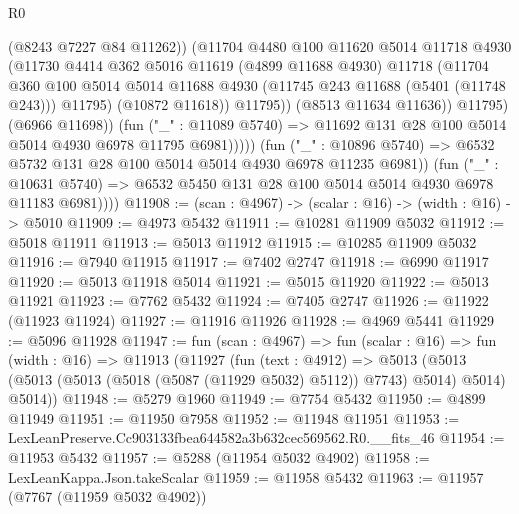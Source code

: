 \begin{lexlean}{R0}
\begin{coremodule}
                              (@8243 @7227 @84 @11262))
                            (@11704
                              @4480
                              @100
                              @11620
                              @5014
                              @11718
                              @4930
                              (@11730
                                @4414
                                @362
                                @5016
                                @11619
                                (@4899 @11688 @4930)
                                @11718
                                (@11704
                                  @360
                                  @100
                                  @5014
                                  @5014
                                  @11688
                                  @4930
                                  (@11745 @243 @11688 (@5401 (@11748 @243)))
                                  @11795)
                                (@10872 @11618))
                              @11795))
                          (@8513 @11634 @11636))
                        @11795)
                      (@6966 @11698))
                    (fun ("_" : @11089 @5740) =>
                    @11692 @131 @28 @100 @5014 @5014 @4930 @6978 @11795 @6981)))))
            (fun ("_" : @10896 @5740) =>
            @6532 @5732 @131 @28 @100 @5014 @5014 @4930 @6978 @11235 @6981))
          (fun ("_" : @10631 @5740) =>
          @6532 @5450 @131 @28 @100 @5014 @5014 @4930 @6978 @11183 @6981))))
@11908 := (scan : @4967) -> (scalar : @16) -> (width : @16) -> @5010
@11909 := @4973 @5432
@11911 := @10281 @11909 @5032
@11912 := @5018 @11911
@11913 := @5013 @11912
@11915 := @10285 @11909 @5032
@11916 := @7940 @11915
@11917 := @7402 @2747
@11918 := @6990 @11917
@11920 := @5013 @11918 @5014
@11921 := @5015 @11920
@11922 := @5013 @11921
@11923 := @7762 @5432
@11924 := @7405 @2747
@11926 := @11922 (@11923 @11924)
@11927 := @11916 @11926
@11928 := @4969 @5441
@11929 := @5096 @11928
@11947 := fun (scan : @4967) =>
  fun (scalar : @16) =>
  fun (width : @16) =>
  @11913
    (@11927
      (fun (text : @4912) =>
      @5013 (@5013 (@5013 (@5013 (@5018 (@5087 (@11929 @5032) @5112)) @7743) @5014) @5014) @5014))
@11948 := @5279 @1960
@11949 := @7754 @5432
@11950 := @4899 @11949
@11951 := @11950 @7958
@11952 := @11948 @11951
@11953 := LexLeanPreserve.Cc903133fbea644582a3b632cec569562.R0.__fits_46
@11954 := @11953 @5432
@11957 := @5288 (@11954 @5032 @4902)
@11958 := LexLeanKappa.Json.takeScalar
@11959 := @11958 @5432
@11963 := @11957 (@7767 (@11959 @5032 @4902))

\end{coremodule}
\end{lexlean}

